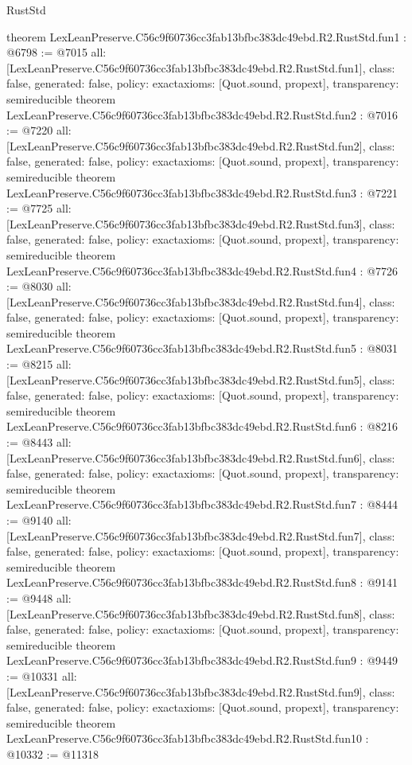 \begin{lexlean}{RustStd}
\begin{coremodule}
{}
theorem LexLeanPreserve.C56c9f60736cc3fab13bfbc383dc49ebd.R2.RustStd.fun1 : @6798 := @7015 {
  all: [LexLeanPreserve.C56c9f60736cc3fab13bfbc383dc49ebd.R2.RustStd.fun1],
  class: false,
  generated: false,
  policy: exact{axioms: [Quot.sound, propext]},
  transparency: semireducible
}
theorem LexLeanPreserve.C56c9f60736cc3fab13bfbc383dc49ebd.R2.RustStd.fun2 : @7016 := @7220 {
  all: [LexLeanPreserve.C56c9f60736cc3fab13bfbc383dc49ebd.R2.RustStd.fun2],
  class: false,
  generated: false,
  policy: exact{axioms: [Quot.sound, propext]},
  transparency: semireducible
}
theorem LexLeanPreserve.C56c9f60736cc3fab13bfbc383dc49ebd.R2.RustStd.fun3 : @7221 := @7725 {
  all: [LexLeanPreserve.C56c9f60736cc3fab13bfbc383dc49ebd.R2.RustStd.fun3],
  class: false,
  generated: false,
  policy: exact{axioms: [Quot.sound, propext]},
  transparency: semireducible
}
theorem LexLeanPreserve.C56c9f60736cc3fab13bfbc383dc49ebd.R2.RustStd.fun4 : @7726 := @8030 {
  all: [LexLeanPreserve.C56c9f60736cc3fab13bfbc383dc49ebd.R2.RustStd.fun4],
  class: false,
  generated: false,
  policy: exact{axioms: [Quot.sound, propext]},
  transparency: semireducible
}
theorem LexLeanPreserve.C56c9f60736cc3fab13bfbc383dc49ebd.R2.RustStd.fun5 : @8031 := @8215 {
  all: [LexLeanPreserve.C56c9f60736cc3fab13bfbc383dc49ebd.R2.RustStd.fun5],
  class: false,
  generated: false,
  policy: exact{axioms: [Quot.sound, propext]},
  transparency: semireducible
}
theorem LexLeanPreserve.C56c9f60736cc3fab13bfbc383dc49ebd.R2.RustStd.fun6 : @8216 := @8443 {
  all: [LexLeanPreserve.C56c9f60736cc3fab13bfbc383dc49ebd.R2.RustStd.fun6],
  class: false,
  generated: false,
  policy: exact{axioms: [Quot.sound, propext]},
  transparency: semireducible
}
theorem LexLeanPreserve.C56c9f60736cc3fab13bfbc383dc49ebd.R2.RustStd.fun7 : @8444 := @9140 {
  all: [LexLeanPreserve.C56c9f60736cc3fab13bfbc383dc49ebd.R2.RustStd.fun7],
  class: false,
  generated: false,
  policy: exact{axioms: [Quot.sound, propext]},
  transparency: semireducible
}
theorem LexLeanPreserve.C56c9f60736cc3fab13bfbc383dc49ebd.R2.RustStd.fun8 : @9141 := @9448 {
  all: [LexLeanPreserve.C56c9f60736cc3fab13bfbc383dc49ebd.R2.RustStd.fun8],
  class: false,
  generated: false,
  policy: exact{axioms: [Quot.sound, propext]},
  transparency: semireducible
}
theorem LexLeanPreserve.C56c9f60736cc3fab13bfbc383dc49ebd.R2.RustStd.fun9 : @9449 := @10331 {
  all: [LexLeanPreserve.C56c9f60736cc3fab13bfbc383dc49ebd.R2.RustStd.fun9],
  class: false,
  generated: false,
  policy: exact{axioms: [Quot.sound, propext]},
  transparency: semireducible
}
theorem LexLeanPreserve.C56c9f60736cc3fab13bfbc383dc49ebd.R2.RustStd.fun10 : @10332 := @11318 {
}
\end{coremodule}
\end{lexlean}
